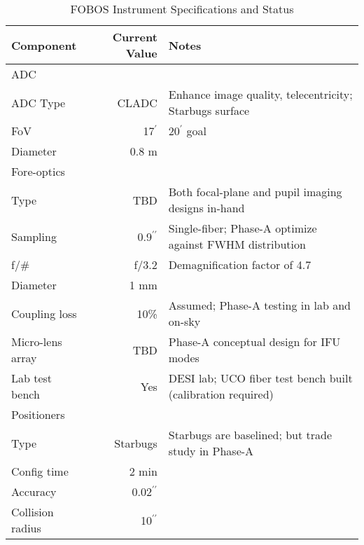 \begin{table}[h!]
\centering
\scriptsize
\caption{FOBOS Instrument Specifications and Status}
\label{tab:specs}
\vspace*{-10pt}
\begin{tabular}{l r l}
Component                     & Current Value & Notes \\
\hline
ADC \\
\hline
\hspace{0.2cm} ADC Type & CLADC & Enhance image quality, telecentricity; Starbugs surface \\
\hspace{0.2cm} FoV & 17$^\prime$ & 20$^\prime$ goal \\
\hspace{0.2cm} Diameter & 0.8 m & \\
\hline
Fore-optics \\
\hline
\hspace{0.2cm} Type & TBD & Both focal-plane and pupil imaging designs in-hand \\
\hspace{0.2cm} Sampling & 0.9$^{\prime\prime}$ & Single-fiber; Phase-A optimize against FWHM distribution \\
\hspace{0.2cm} f/\# & f/3.2 & Demagnification factor of 4.7 \\
\hspace{0.2cm} Diameter & 1 mm & \\
\hspace{0.2cm} Coupling loss & 10\% & Assumed; Phase-A testing in lab and on-sky\\
\hspace{0.2cm} Micro-lens array & TBD & Phase-A conceptual design for IFU modes \\
\hspace{0.2cm} Lab test bench & Yes & DESI lab; UCO fiber test bench built (calibration required) \\
\hline
Positioners \\
\hline
\hspace{0.2cm} Type & Starbugs & Starbugs are baselined; but trade study in Phase-A \\
\hspace{0.2cm} Config time & 2 min &  \\
\hspace{0.2cm} Accuracy & 0.02$^{\prime\prime}$ &  \\
\hspace{0.2cm} Collision radius & 10$^{\prime\prime}$ &  \\

\end{tabular}
\end{table}
